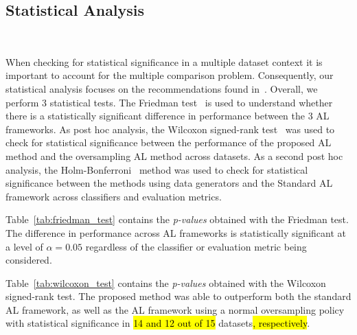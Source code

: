\documentclass[preprint, 12pt]{elsarticle}
\begin{document}
\subsection{Statistical Analysis}~\label{sec:statistical-analysis}

When checking for statistical significance in a multiple dataset context it is
important to account for the multiple comparison problem. Consequently, our
statistical analysis focuses on the recommendations found
in~\cite{Demsar2006}. Overall, we perform 3 statistical tests. The Friedman
test~\cite{Friedman1937} is used to understand whether there is a
statistically significant difference in performance between the 3 AL
frameworks. As post hoc analysis, the Wilcoxon signed-rank
test~\cite{Wilcoxon1945} was used to check for statistical significance
between the performance of the proposed AL method and the oversampling AL
method across datasets. As a second post hoc analysis, the
Holm-Bonferroni~\cite{Holm1979} method was used to check for statistical
significance between the methods using data generators and the Standard AL
framework across classifiers and evaluation metrics.
 
Table~\ref{tab:friedman_test} contains the \textit{p-values} obtained with the
Friedman test. The difference in performance across AL frameworks is
statistically significant at a level of $\alpha = 0.05$ regardless of the
classifier or evaluation metric being considered.

\begin{table}[H]
	\centering
    \caption{%
        Results for Friedman test. Statistical significance is tested at a
        level of $\alpha = 0.05$. The null hypothesis is that there is no
        difference in the classification outcome across oversamplers.
    }\label{tab:friedman_test}
\end{table}

Table~\ref{tab:wilcoxon_test} contains the \textit{p-values} obtained with the
Wilcoxon signed-rank test. The proposed method was able to outperform both the
standard AL framework, as well as the AL framework using a normal oversampling
policy with statistical significance in \hl{14 and 12 out of 15} datasets\hl{,
respectively}.

\begin{table}
	\centering
    \caption{%
        Adjusted p-values using the Wilcoxon signed-rank method. Bold values
        are statistically significant at a level of $\alpha = 0.05$. The null
        hypothesis is that the performance of the proposed framework is
        similar to that of the oversampling or standard framework.
    }\label{tab:wilcoxon_test}
\end{table}
\end{document}
